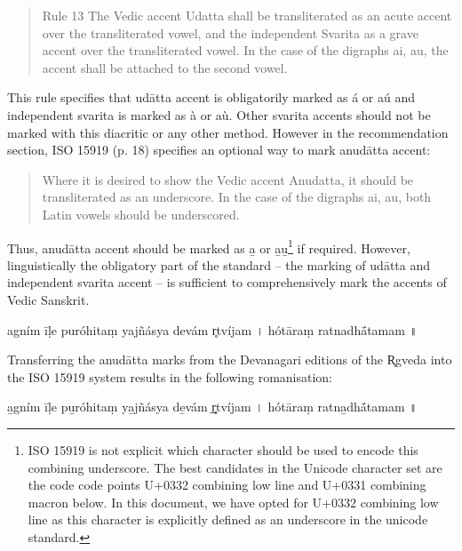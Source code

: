 \begin{quote}Rule 13 The Vedic accent Udatta shall be transliterated as an acute accent over the transliterated vowel, and the independent Svarita as a grave accent over the transliterated vowel. In the case of the digraphs ai, au, the accent shall be attached to the second vowel.\end{quote}

This rule specifies that udātta accent is obligatorily marked as á or aú and independent svarita is marked as à or aù. Other svarita accents should not be marked with this diacritic or any other method. However in the recommendation section, ISO 15919 (p. 18) specifies an optional way to mark anudātta accent:

\begin{quote}Where it is desired to show the Vedic accent Anudatta, it should be transliterated as an underscore. In the case of the digraphs ai, au, both Latin vowels should be underscored.\end{quote}

Thus, anudātta accent should be marked as a̲ or a̲u̲\footnote{ISO 15919 is not explicit which character should be used to encode this combining underscore. The best candidates in the Unicode character set are the code code points  U+0332 {\sc combining low line} and U+0331 {\sc combining macron below}. In this document, we have opted for U+0332 {\sc combining low line} as this character is explicitly defined as an underscore in the unicode standard.} if required. However, linguistically the obligatory part of the standard – the marking of udātta and independent svarita accent – is sufficient to comprehensively mark the accents of Vedic Sanskrit.

\begin{exe}
\ex\label{ex:rgnormal} agním īḷe puróhitaṃ yajñásya devám r̥tvíjam {\devfont ।} hótāraṃ ratnadhā́tamam {\devfont ॥}
\end{exe}


Transferring the anudātta marks from the Devanagari editions of the R̥gveda into the ISO 15919 system results in the following romanisation:

\begin{exe}
\ex\label{ex:rgisoanu} a̲gním īḷe pu̲róhitaṃ ya̲jñásya de̲vám r̥̲tvíjam {\devfont ।} hótāraṃ ratna̲dhā́tamam {\devfont ॥}
\end{exe}

